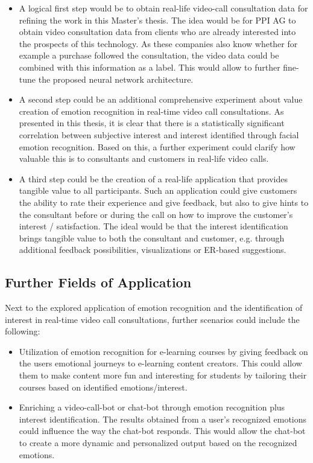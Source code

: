 \begin{itemize}
    \item A logical first step would be to obtain real-life video-call consultation data for refining the work in this Master's thesis. The idea would be for PPI AG to obtain video consultation data from clients who are already interested into the prospects of this technology. As these companies also know whether for example a purchase followed the consultation, the video data could be combined with this information as a label. This would allow to further fine-tune the proposed neural network architecture.
    \item A second step could be an additional comprehensive experiment about value creation of emotion recognition in real-time video call consultations. As presented in this thesis, it is clear that there is a statistically significant correlation between subjective interest and interest identified through facial emotion recognition. Based on this, a further experiment could clarify how valuable this is to consultants and customers in real-life video calls.
    \item A third step could be the creation of a real-life application that provides tangible value to all participants. Such an application could give customers the ability to rate their experience and give feedback, but also to give hints to the consultant before or during the call on how to improve the customer's interest / satisfaction. The ideal would be that the interest identification brings tangible value to both the consultant and customer, e.g. through additional feedback possibilities, visualizations or ER-based suggestions.
\end{itemize}

\subsection{Further Fields of Application}
Next to the explored application of emotion recognition and the identification of interest in real-time video call consultations, further scenarios could include the following:\newline
\begin{itemize}
    \item Utilization of emotion recognition for e-learning courses by giving feedback on the users emotional journeys to e-learning content creators. This could allow them to make content more fun and interesting for students by tailoring their courses based on identified emotions/interest.
    \item Enriching a video-call-bot or chat-bot through emotion recognition plus interest identification. The results obtained from a user's recognized emotions could influence the way the chat-bot responds. This would allow the chat-bot to create a more dynamic and personalized output based on the recognized emotions.
\end{itemize}


